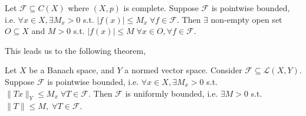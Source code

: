 \begin{thm}
    Let $\mathcal{F} \subseteq C(X)$ where $(X,  p)$ is complete. Suppose $\mathcal{F}$ is pointwise
    bounded, i.e. $\forall x \in X, \exists M_x > 0$ s.t. $| f(x) | \leq M_x \; \forall f \in \mathcal{F}$. 
    Then $\exists$ non-empty open set $O \subseteq X$ and $M > 0$ s.t. 
    $| f(x) | \leq M \; \forall x \in O, \forall f \in \mathcal{F}$.      
\end{thm}

This leads us to the following theorem,

\begin{thm}
    Let $X$ be a Banach space, and $Y$ a normed vector space. Consider $\mathcal{F} \subseteq \mathcal{L}(X, Y)$.
    Suppose $\mathcal{F}$ is pointwise bounded, i.e. $\forall x \in X, \exists M_x > 0$ s.t. 
    $\| T x \|_Y \leq M_x \; \forall T \in \mathcal{F}$. Then $\mathcal{F}$ is uniformly bounded,
    i.e. $\exists M > 0$ s.t. $\| T \| \leq M, \; \forall T \in \mathcal{F}$.  
\end{thm}

